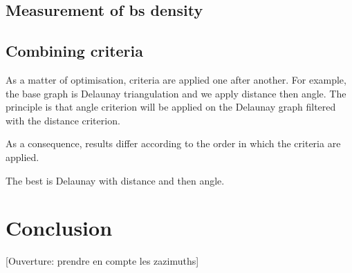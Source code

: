 \documentclass[lettersize,journal,english]{IEEEtran}
\begin{document}
    \subsection{Measurement of \acrshort{bs} density}

    \subsection{Combining criteria}
        As a matter of optimisation, criteria are applied one after another. For example, the base graph is Delaunay triangulation and we apply distance then angle.
        The principle is that angle criterion will be applied on the Delaunay graph filtered with the distance criterion.

        As a consequence, results differ according to the order in which the criteria are applied.

        The best is Delaunay with distance and then angle.

\section{Conclusion}
    [Ouverture: prendre en compte les zazimuths]

\printglossary[type=\acronymtype]
\printglossary



\end{document}
